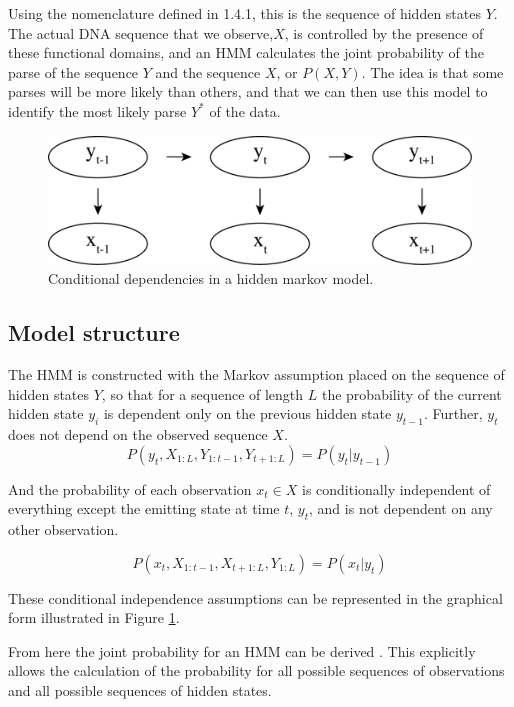 Using the nomenclature defined in 1.4.1, this is the sequence of hidden states $Y$. The actual DNA sequence that we observe,$X$, is controlled by the presence of these functional domains, and an HMM calculates the joint probability of the parse of the sequence $Y$ and the sequence $X$, or $P(X,Y)$. The idea is that some parses will be more likely than others, and that we can then use this model to identify the most likely parse $Y^*$ of the data. 
\begin{figure}[h]
\centering
\includegraphics[width=\textwidth]{images/hmm.pdf}
\caption{Conditional dependencies in a hidden markov model.}
\label{fig:HMM}
\end{figure}
\subsection{Model structure}
The HMM is constructed with the Markov assumption placed on the sequence of hidden states $Y$, so that for a sequence of length $L$ the probability of the current hidden state $y_i$ is dependent only on the previous hidden state $y_{t-1}$. Further, $y_t$ does not depend on the observed sequence $X$. 
\begin{equation}
    P(y_t,X_{1:L},Y_{1:t-1},Y_{t+1:L}) = P(y_t|y_{t-1})
\end{equation}

And the probability of each observation $x_t \in X$ is conditionally independent of everything except the emitting state at time $t$, $y_t$, and is not dependent on any other observation.

\begin{equation}
    P(x_t,X_{1:t-1},X_{t+1:L},Y_{1:L}) = P(x_t|y_t)
\end{equation}

These conditional independence assumptions can be represented in the graphical form illustrated in Figure \ref{fig:HMM}. 

From here the joint probability for an HMM can be derived \cite{Rabiner1989ARecognition}. This explicitly allows the calculation of the probability for all possible sequences of observations and all possible sequences of hidden states. 

